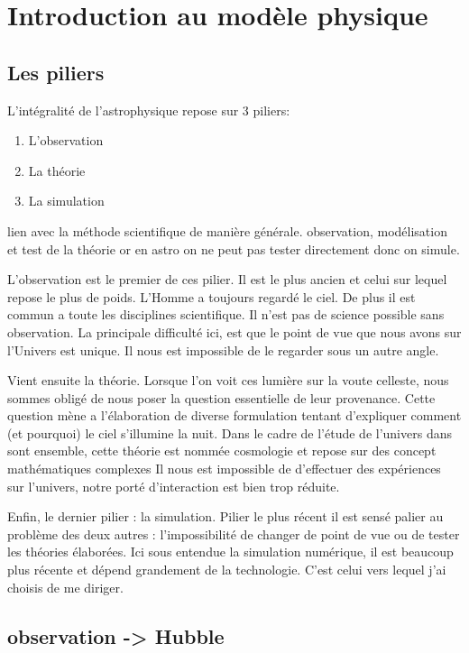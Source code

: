 \chapter{Introduction au modèle physique }\label{ch:introduction_physique}

\section{Les piliers}

L'intégralité de l'astrophysique repose sur 3 piliers:
\begin{enumerate}
\item L'observation
\item La théorie
\item La simulation
\end{enumerate}

lien avec la méthode scientifique de manière générale. observation, modélisation et test de la théorie or en astro on ne peut pas tester directement donc on simule.

L'observation est le premier de ces pilier. 
Il est le plus ancien et celui sur lequel repose le plus de poids.
L'Homme a toujours regardé le ciel.
De plus il est commun a toute les disciplines scientifique.
Il n'est pas de science possible sans observation.
La principale difficulté ici, est que le point de vue que nous avons sur l'Univers est unique. 
Il nous est impossible de le regarder sous un autre angle.

Vient ensuite la théorie.
Lorsque l'on voit ces lumière sur la voute celleste, nous sommes obligé de nous poser la question essentielle de leur provenance.
Cette question mène a l'élaboration de diverse formulation tentant d'expliquer comment (et pourquoi) le ciel s'illumine la nuit.  
Dans le cadre de l'étude de l'univers dans sont ensemble, cette théorie est nommée cosmologie et repose sur des concept mathématiques complexes
Il nous est impossible de d'effectuer des expériences sur l'univers, notre porté d'interaction est bien trop réduite.

Enfin, le dernier pilier : la simulation.
Pilier le plus récent il est sensé palier au problème des deux autres : l'impossibilité de changer de point de vue ou de tester les théories élaborées.
Ici sous entendue la simulation numérique, il est beaucoup plus récente et dépend grandement de la technologie.
C'est celui vers lequel j'ai choisis de me diriger.

\section{observation -> Hubble}

